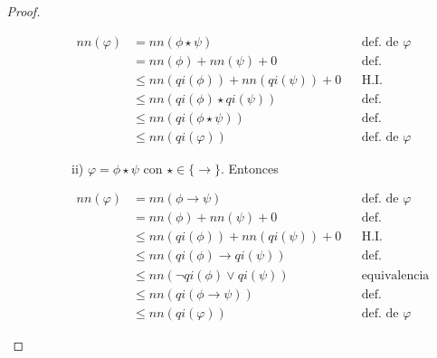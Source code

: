 \documentclass[letterpaper,12pt]{article}
\begin{document}
\begin{enumerate}
\begin{enumerate}
\begin{proof}
\begin{itemize}
\begin{enumerate}
\begin{itemize}
                        \begin{align*}
                            nn(\varphi) 
                            &= nn(\phi \star \psi)
                            && \text{def. de $\varphi$} \\
                            &= nn(\phi) + nn(\psi) + 0
                            && \text{def. recursiva de nn} \\
                            &\leq nn(qi(\phi)) + nn(qi(\psi)) + 0
                            && \text{H.I.} \\
                            &\leq nn(qi(\phi) \star qi(\psi))
                            && \text{def. recursiva de nn} \\
                            &\leq nn(qi(\phi \star \psi))
                            && \text{def. recursiva de qi} \\
                            &\leq nn(qi(\varphi)) 
                            && \text{def. de $\varphi$}
                        \end{align*}

                        \item[ii)] $\varphi = \phi \star \psi$ con 
                        $\star \in \{ \rightarrow\}$. Entonces 
                        
                        \begin{align*}
                            nn(\varphi) 
                            &= nn(\phi \rightarrow \psi)
                            && \text{def. de $\varphi$} \\
                            &= nn(\phi) + nn(\psi) + 0
                            && \text{def. recursiva de nn} \\
                            &\leq nn(qi(\phi)) + nn(qi(\psi)) + 0
                            && \text{H.I.} \\
                            &\leq nn(qi(\phi) \rightarrow qi(\psi))
                            && \text{def. recursiva de nn} \\
                            &\leq nn(\neg qi(\phi) \lor qi(\psi))
                            && \text{equivalencia lógica} \\
                            &\leq nn(qi(\phi \rightarrow \psi))
                            && \text{def. recursiva de qi} \\
                            &\leq nn(qi(\varphi))
                            && \text{def. de $\varphi$}
                        \end{align*}


\end{itemize}
\end{enumerate}
\end{itemize}
\end{proof}
\end{enumerate}
\end{enumerate}
\end{document}
